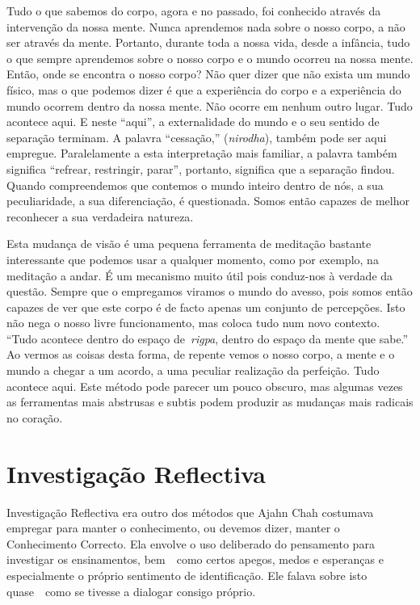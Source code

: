 Tudo o que sabemos do corpo, agora e no passado, foi conhecido através
da intervenção da nossa mente. Nunca aprendemos nada sobre o nosso
corpo, a não ser através da mente. Portanto, durante toda a nossa vida,
desde a infância, tudo o que sempre aprendemos sobre o nosso corpo e o
mundo ocorreu na nossa mente. Então, onde se encontra o nosso corpo? Não
quer dizer que não exista um mundo físico, mas o que podemos dizer é que
a experiência do corpo e a experiência do mundo ocorrem dentro da nossa
mente. Não ocorre em nenhum outro lugar. Tudo acontece aqui. E neste
``aqui'', a externalidade do mundo e o seu sentido de separação
terminam. A palavra ``cessação,'' (\emph{nirodha}), também pode ser aqui
empregue. Paralelamente a esta interpretação mais familiar, a palavra
também significa ``refrear, restringir, parar'', portanto, significa que
a separação findou. Quando compreendemos que contemos o mundo inteiro
dentro de nós, a sua peculiaridade, a sua diferenciação, é questionada.
Somos então capazes de melhor reconhecer a sua verdadeira natureza.~

Esta mudança de visão é uma pequena ferramenta de meditação bastante
interessante que podemos usar a qualquer momento, como por exemplo, na
meditação a andar. É um mecanismo muito útil pois conduz-nos à verdade
da questão. Sempre que o empregamos viramos o mundo do avesso, pois
somos então capazes de ver que este corpo é de facto apenas um conjunto
de percepções. Isto não nega o nosso livre funcionamento, mas coloca
tudo num novo contexto. ``Tudo acontece dentro do espaço
de~\emph{rigpa}, dentro do espaço da mente que sabe.'' Ao vermos as
coisas desta forma, de repente vemos o nosso corpo, a mente e o mundo a
chegar a um acordo, a uma peculiar realização da perfeição. Tudo
acontece aqui. Este método pode parecer um pouco obscuro, mas algumas
vezes as ferramentas mais abstrusas e subtis podem produzir as mudanças
mais radicais no coração.

\section{Investigação Reflectiva}

Investigação Reflectiva era outro dos métodos que Ajahn Chah costumava
empregar para manter o conhecimento, ou devemos dizer, manter o
Conhecimento Correcto. Ela envolve o uso deliberado do pensamento para
investigar os ensinamentos, bem~~como certos apegos, medos e esperanças
e especialmente o próprio sentimento de identificação. Ele falava sobre
isto quase~~como se tivesse a dialogar consigo próprio.

